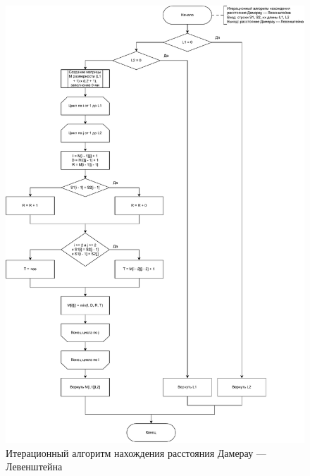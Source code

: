 \begin{figure}[H]
	\centering
	\includegraphics[scale=0.6]{img/dlev_ifm.pdf}
	\caption{Итерационный алгоритм нахождения расстояния Дамерау --- Левенштейна}
	\label{fig:dlifm}
\end{figure}

